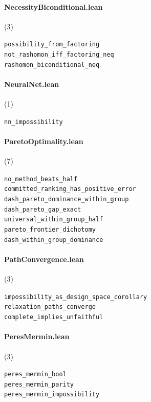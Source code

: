 \paragraph{NecessityBiconditional.lean} (3)

{\footnotesize
\texttt{possibility\_from\_factoring}\\
\texttt{not\_rashomon\_iff\_factoring\_neq}\\
\texttt{rashomon\_biconditional\_neq}\\
}

\paragraph{NeuralNet.lean} (1)

{\footnotesize
\texttt{nn\_impossibility}\\
}

\paragraph{ParetoOptimality.lean} (7)

{\footnotesize
\texttt{no\_method\_beats\_half}\\
\texttt{committed\_ranking\_has\_positive\_error}\\
\texttt{dash\_pareto\_dominance\_within\_group}\\
\texttt{dash\_pareto\_gap\_exact}\\
\texttt{universal\_within\_group\_half}\\
\texttt{pareto\_frontier\_dichotomy}\\
\texttt{dash\_within\_group\_dominance}\\
}

\paragraph{PathConvergence.lean} (3)

{\footnotesize
\texttt{impossibility\_as\_design\_space\_corollary}\\
\texttt{relaxation\_paths\_converge}\\
\texttt{complete\_implies\_unfaithful}\\
}

\paragraph{PeresMermin.lean} (3)

{\footnotesize
\texttt{peres\_mermin\_bool}\\
\texttt{peres\_mermin\_parity}\\
\texttt{peres\_mermin\_impossibility}\\
}


